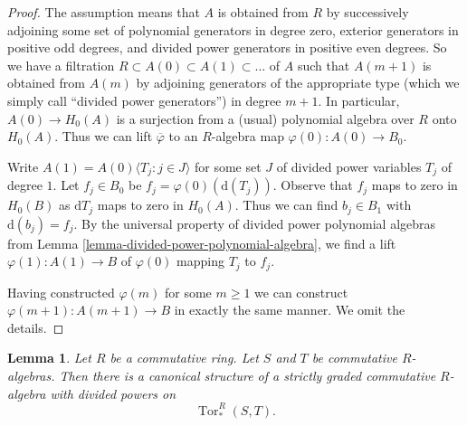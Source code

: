 \documentclass{stacks-project}
\theoremstyle{plain}
\newtheorem{lemma}[subsection]{Lemma}
\theoremstyle{definition}
\theoremstyle{remark}
\numberwithin{equation}{subsection}
\begin{document}
\begin{proof}
The assumption means that $A$ is obtained from $R$ by successively adjoining
some set of polynomial generators in degree zero, exterior generators
in positive odd degrees, and divided power generators
in positive even degrees. So we have a filtration
$R \subset A(0) \subset A(1) \subset \ldots$
of $A$ such that $A(m + 1)$ is obtained from $A(m)$ by adjoining
generators of the appropriate type (which we simply call
``divided power generators'') in degree $m + 1$.
In particular, $A(0) \to H_0(A)$ is a surjection from a (usual) polynomial
algebra over $R$ onto $H_0(A)$. Thus we can lift $\overline{\varphi}$
to an $R$-algebra map $\varphi(0) : A(0) \to B_0$.

\medskip\noindent
Write $A(1) = A(0)\langle T_j:j\in J\rangle$ for some
set $J$ of divided power variables $T_j$ of degree $1$. Let $f_j \in B_0$
be $f_j = \varphi(0)(\text{d}(T_j))$. Observe that $f_j$
maps to zero in $H_0(B)$ as $\text{d}T_j$ maps to zero in $H_0(A)$.
Thus we can find $b_j \in B_1$ with $\text{d}(b_j) = f_j$.
By the universal property of divided power polynomial algebras from
Lemma \ref{lemma-divided-power-polynomial-algebra},
we find a lift $\varphi(1) : A(1) \to B$ of $\varphi(0)$
mapping $T_j$ to $f_j$.

\medskip\noindent
Having constructed $\varphi(m)$ for some $m \geq 1$ we can construct
$\varphi(m + 1) : A(m + 1) \to B$ in exactly the same manner.
We omit the details.
\end{proof}

\begin{lemma}
\label{lemma-divided-powers-on-tor}
Let $R$ be a commutative ring. Let $S$ and $T$ be commutative $R$-algebras.
Then there is a canonical structure
of a strictly graded commutative $R$-algebra with divided powers on
$$
\operatorname{Tor}_*^R(S, T).
$$
\end{lemma}
\end{document}
